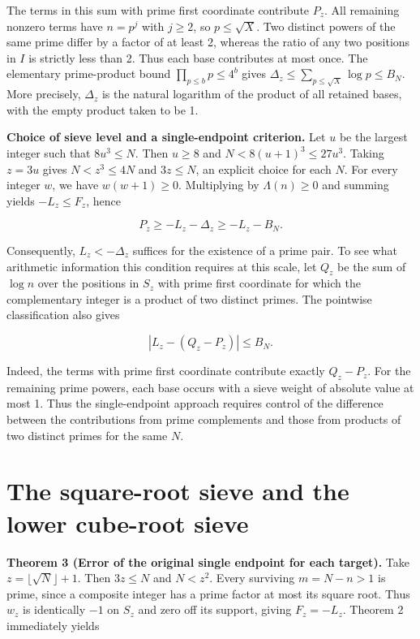 \documentclass[11pt,a4paper]{article}
\begin{document}
The terms in this sum with prime first coordinate contribute $P_z$. All remaining nonzero terms have $n=p^j$ with $j\ge2$, so $p\le\sqrt X$. Two distinct powers of the same prime differ by a factor of at least 2, whereas the ratio of any two positions in $I$ is strictly less than 2. Thus each base contributes at most once. The elementary prime-product bound $\prod_{p\le b}p\le4^b$ gives $\Delta_z\le\sum_{p\le\sqrt X}\log p\le B_N$. More precisely, $\Delta_z$ is the natural logarithm of the product of all retained bases, with the empty product taken to be 1.

\textbf{Choice of sieve level and a single-endpoint criterion.} Let $u$ be the largest integer such that $8u^3\le N$. Then $u\ge8$ and $N<8(u+1)^3\le27u^3$. Taking $z=3u$ gives $N<z^3\le4N$ and $3z\le N$, an explicit choice for each $N$. For every integer $w$, we have $w(w+1)\ge0$. Multiplying by $\Lambda(n)\ge0$ and summing yields $-L_z\le F_z$, hence

\[
P_z\ge -L_z-\Delta_z\ge -L_z-B_N.
\]

Consequently, $L_z<-\Delta_z$ suffices for the existence of a prime pair. To see what arithmetic information this condition requires at this scale, let $Q_z$ be the sum of $\log n$ over the positions in $S_z$ with prime first coordinate for which the complementary integer is a product of two distinct primes. The pointwise classification also gives

\[
\left|L_z-(Q_z-P_z)\right|\le B_N.
\]

Indeed, the terms with prime first coordinate contribute exactly $Q_z-P_z$. For the remaining prime powers, each base occurs with a sieve weight of absolute value at most 1. Thus the single-endpoint approach requires control of the difference between the contributions from prime complements and those from products of two distinct primes for the same $N$.

\section{The square-root sieve and the lower cube-root sieve}

\textbf{Theorem 3 (Error of the original single endpoint for each target).} Take $z=\lfloor\sqrt N\rfloor+1$. Then $3z\le N$ and $N<z^2$. Every surviving $m=N-n>1$ is prime, since a composite integer has a prime factor at most its square root. Thus $w_z$ is identically $-1$ on $S_z$ and zero off its support, giving $F_z=-L_z$. Theorem 2 immediately yields
\end{document}
